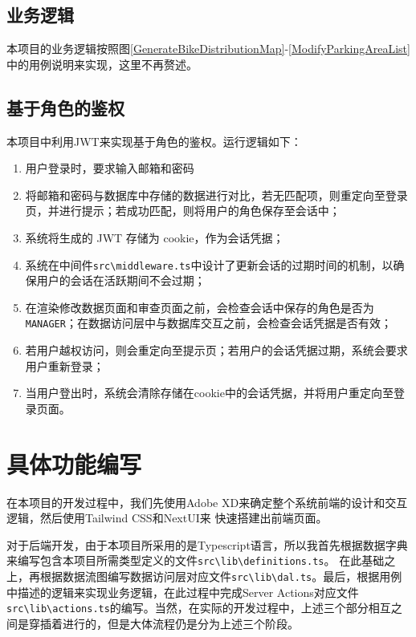 \subsection{业务逻辑}
本项目的业务逻辑按照图\ref{GenerateBikeDistributionMap}-\ref{ModifyParkingAreaList}中的用例说明来实现，这里不再赘述。
\subsection{基于角色的鉴权}
本项目中利用JWT来实现基于角色的鉴权。运行逻辑如下：

\begin{enumerate}
        \item 用户登录时，要求输入邮箱和密码
        \item 将邮箱和密码与数据库中存储的数据进行对比，若无匹配项，则重定向至登录页，并进行提示；若成功匹配，则将用户的角色保存至会话中；
        \item 系统将生成的 JWT 存储为 cookie，作为会话凭据；
        \item 系统在中间件\verb|src\middleware.ts|中设计了更新会话的过期时间的机制，以确保用户的会话在活跃期间不会过期；
        \item 在渲染修改数据页面和审查页面之前，会检查会话中保存的角色是否为 \verb|MANAGER|；在数据访问层中与数据库交互之前，会检查会话凭据是否有效；
        \item 若用户越权访问，则会重定向至提示页；若用户的会话凭据过期，系统会要求用户重新登录；
        \item 当用户登出时，系统会清除存储在cookie中的会话凭据，并将用户重定向至登录页面。
\end{enumerate}


\section{具体功能编写}
在本项目的开发过程中，我们先使用Adobe XD来确定整个系统前端的设计和交互逻辑，然后使用Tailwind CSS和NextUI来
快速搭建出前端页面。

对于后端开发，由于本项目所采用的是Typescript语言，所以我首先根据数据字典来编写包含本项目所需类型定义的文件\verb|src\lib\definitions.ts|。
在此基础之上，再根据数据流图编写数据访问层对应文件\verb|src\lib\dal.ts|。最后，根据用例中描述的逻辑来实现业务逻辑，在此过程中完成Server Actions对应文件
\verb|src\lib\actions.ts|的编写。当然，在实际的开发过程中，上述三个部分相互之间是穿插着进行的，但是大体流程仍是分为上述三个阶段。

